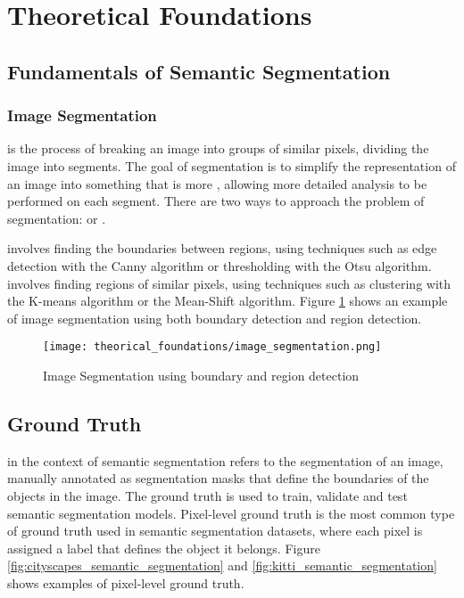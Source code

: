 \section{Theoretical Foundations}

  \subsection{Fundamentals of Semantic Segmentation}

    \subsubsection{Image Segmentation}

       is the process of breaking an image into groups of similar
      pixels\cite{intelligence2021modern}, dividing the image into segments. The
      goal of segmentation is to simplify the representation of an image into something
      that is more , allowing more detailed analysis to be performed
      on each segment. There are two ways to approach the problem of segmentation:
       or \cite{intelligence2021modern}.

       involves finding the boundaries between regions, using techniques
      such as edge detection with the Canny algorithm\cite{canny1986computational} or
      thresholding with the Otsu algorithm\cite{otsu1979threshold}. 
      involves finding regions of similar pixels, using techniques such as clustering
      with the K-means algorithm\cite{macqueen1965some} or the Mean-Shift algorithm\cite{comaniciu2002mean}.
      Figure \ref{fig:image_segmentation} shows an example of image segmentation using
      both boundary detection and region detection.

      \begin{figure}[htbp]
        \centering
        \texttt{[image: theorical\_foundations/image\_segmentation.png]}
        \caption{Image Segmentation using boundary and region detection \cite{intelligence2021modern}}
        \label{fig:image_segmentation}
      \end{figure}

    \subsection{Ground Truth}

       in the context of semantic segmentation refers to the
       segmentation of an image, manually annotated as segmentation masks
      that define the boundaries of the objects in the image\cite{intelligence2021modern}.
      The ground truth is used to train, validate and test semantic segmentation models. Pixel-level
      ground truth is the most common type of ground truth used in semantic segmentation
      datasets, where each pixel is assigned a label that defines the object it belongs.
      Figure \ref{fig:cityscapes_semantic_segmentation} and \ref{fig:kitti_semantic_segmentation}
      shows examples of pixel-level ground truth.
 
